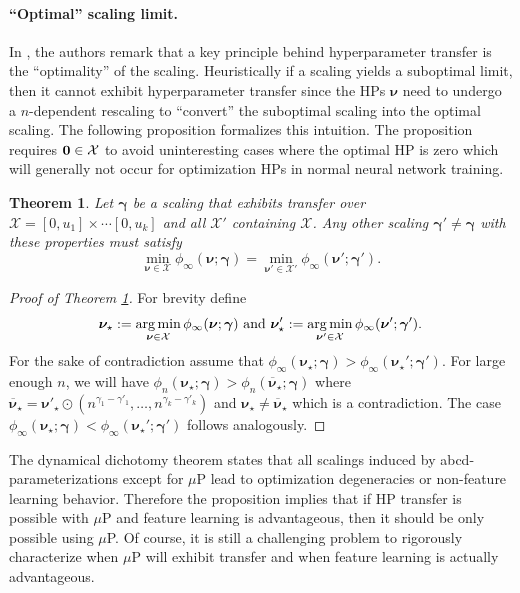 \documentclass{article} %
\newtheorem{theorem}{Theorem}
\newcommand{\ol}{\overline}
\newcommand{\bhp}{\bm{\nu}}                       %
\newcommand{\hpexp}{\gamma}                       %
\newcommand{\bhpexp}{\bm{\gamma}}                 %
\newcommand{\searchspace}{\mathcal{X}}            %
\newcommand{\ub}{u}
\renewcommand{\citep}[1]{\cite{#1}}
\begin{document}
\paragraph{``Optimal'' scaling limit.} 
In \citep{yang2022tensor, yang2023depth}, the authors remark that a key principle behind hyperparameter transfer is the ``optimality'' of the scaling. Heuristically if a scaling yields a suboptimal limit, then it cannot exhibit hyperparameter transfer since the HPs $\bhp$ need to undergo a $n$-dependent rescaling to ``convert'' the suboptimal scaling into the optimal scaling. The following proposition formalizes this intuition. The proposition requires $\bzero \in \searchspace$ to avoid uninteresting cases where the optimal HP is zero which will generally not occur for optimization HPs in normal neural network training.
\begin{theorem}\label{thm:transfer_optimality}
    Let $\bhpexp$ be a scaling that exhibits transfer over $\searchspace = [0, \ub_1] \times \cdots [0, \ub_k]$ and all $\searchspace'$ containing $\searchspace$. Any other scaling $\bhpexp' \neq \bhpexp$ with these properties must satisfy 
    \[
    \min_{\bhp \in \searchspace} \phi_\infty(\bhp; \bhpexp) = \min_{\bhp' \in \searchspace'} \phi_\infty(\bhp'; \bhpexp').
    \]
\end{theorem}
\begin{proof}[Proof of Theorem \ref{thm:transfer_optimality}]
    For brevity define
    \[
        \bhp_\star := \argmin_{\bhp \in \searchspace} \phi_\infty(\bhp; \bhpexp) \text{ and } \bhp'_\star := \argmin_{\bhp' \in \searchspace} \phi_\infty(\bhp'; \bhpexp').
    \]
    For the sake of contradiction assume that $\phi_\infty(\bhp_\star; \bhpexp) > \phi_\infty(\bhp_\star'; \bhpexp')$. For large enough $n$, we will have $\phi_n(\bhp_\star; \bhpexp) > \phi_n(\ol{\bhp}_\star; \bhpexp)$ where $\ol{\bhp}_\star = \bhp'_\star \odot (n^{\hpexp_1 - \hpexp'_1}, \ldots, n^{\hpexp_k - \hpexp'_k})$ and $\bhp_\star \neq \ol{\bhp}_\star$ which is a contradiction. The case $\phi_\infty(\bhp_\star; \bhpexp) < \phi_\infty(\bhp_\star'; \bhpexp')$ follows analogously.
\end{proof}

The dynamical dichotomy theorem states that all scalings induced by abcd-parameterizations except for $\mu$P lead to optimization degeneracies or non-feature learning behavior. Therefore the proposition implies that if HP transfer is possible with $\mu$P and feature learning is advantageous, then it should be only possible using $\mu$P. Of course, it is still a challenging problem to rigorously characterize when $\mu$P will exhibit transfer and when feature learning is actually advantageous.
\end{document}
